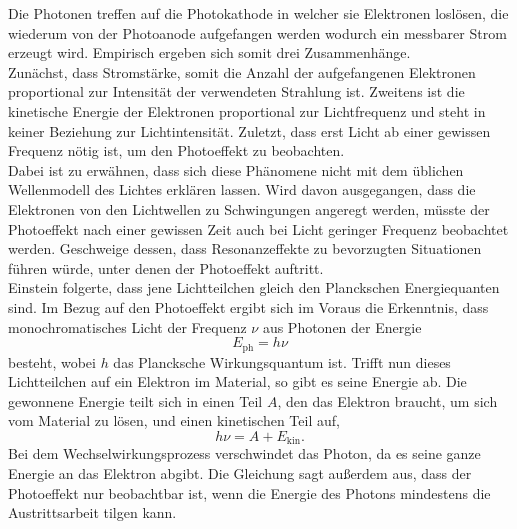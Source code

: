 Die Photonen treffen auf die Photokathode in welcher sie Elektronen loslösen, die wiederum von der Photoanode aufgefangen werden wodurch ein messbarer Strom erzeugt wird.
Empirisch ergeben sich somit drei Zusammenhänge.\\
Zunächst, dass Stromstärke, somit die Anzahl der aufgefangenen Elektronen proportional zur Intensität der verwendeten Strahlung ist.
Zweitens ist die kinetische Energie der Elektronen proportional zur Lichtfrequenz und steht in keiner Beziehung zur Lichtintensität.
Zuletzt, dass erst Licht ab einer gewissen Frequenz nötig ist, um den Photoeffekt zu beobachten.\\
Dabei ist zu erwähnen, dass sich diese Phänomene nicht mit dem üblichen Wellenmodell des Lichtes erklären lassen.
Wird davon ausgegangen, dass die Elektronen von den Lichtwellen zu Schwingungen angeregt werden, müsste der Photoeffekt nach einer gewissen Zeit auch bei Licht geringer Frequenz beobachtet werden.
Geschweige dessen, dass Resonanzeffekte zu bevorzugten Situationen führen würde, unter denen der Photoeffekt auftritt.\\
Einstein folgerte, dass jene Lichtteilchen gleich den Planckschen Energiequanten sind.
Im Bezug auf den Photoeffekt ergibt sich im Voraus die Erkenntnis, dass monochromatisches Licht der Frequenz $\nu$ aus Photonen der Energie
\begin{equation}
  E_{\text{ph}} = h \nu
\end{equation}
besteht, wobei $h$ das Plancksche Wirkungsquantum ist.
Trifft nun dieses Lichtteilchen auf ein Elektron im Material, so gibt es seine Energie ab.
Die gewonnene Energie teilt sich in einen Teil $A$, den das Elektron braucht, um sich vom Material zu lösen, und einen kinetischen Teil auf,
\begin{equation}
  \label{eqn:bla}
  h \nu = A + E_{\text{kin}}.
\end{equation}
Bei dem Wechselwirkungsprozess verschwindet das Photon, da es seine ganze Energie an das Elektron abgibt.
Die Gleichung sagt außerdem aus, dass der Photoeffekt nur beobachtbar ist, wenn die Energie des Photons mindestens die Austrittsarbeit tilgen kann.

